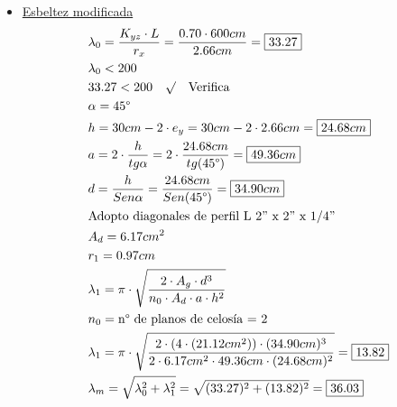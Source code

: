 \begin{itemize}
\item \underline{Esbeltez modificada}
\begin{align*}
& \lambda_0 = \frac{K_{yz} \cdot L}{r_x} = \frac{0.70 \cdot 600cm}{2.66cm} = \framebox{$33.27$}\\
& \lambda_0 < 200 \\
& 33.27 < 200 \quad \surd \quad \text{Verifica} \\
& \alpha = 45\text{°}\\
& h = 30cm - 2 \cdot e_y = 30cm - 2 \cdot 2.66cm = \framebox{$24.68cm$} \\
& a = 2 \cdot \frac{h}{tg \alpha} = 2 \cdot \frac{24.68cm}{tg(45\text{°})} = \framebox{$49.36cm$}\\
& d = \frac{h}{Sen\alpha} = \frac{24.68cm}{Sen(45\text{°})} = \framebox{$34.90cm$}\\
& \text{Adopto diagonales de perfil L 2” x 2” x 1/4”} \\
& A_d = 6.17cm^2 \\
& r_1 = 0.97cm \\
& \lambda_1 = \pi \cdot \sqrt{\frac{2 \cdot A_g \cdot d^3}{n_0 \cdot A_d \cdot a \cdot h^2}} \\
& n_0 = \text{n° de planos de celosía = 2} \\
& \lambda_1 = \pi \cdot \sqrt{\frac{2 \cdot (4\cdot(21.12cm^2)) \cdot (34.90cm)^3}{2 \cdot 6.17cm^2 \cdot 49.36cm \cdot (24.68cm)^2}} = \framebox{$13.82$}\\
& \lambda_m = \sqrt{\lambda_0^2 + \lambda_1^2} = \sqrt{(33.27)^2 + (13.82)^2} = \framebox{$36.03$}
\end{align*}


\end{itemize}
